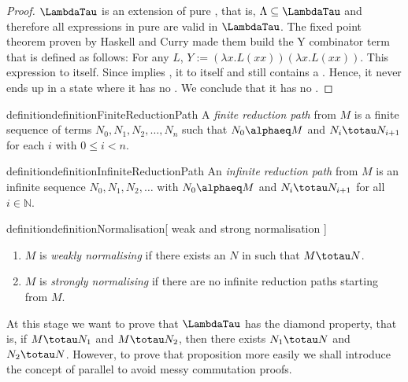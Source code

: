 \begin{proof}
     $\LambdaTau$ is an extension of pure \lambdacalc, that is, $\Lambda \subseteq \LambdaTau$ and therefore all expressions in pure \lambdacalc are valid in $\LambdaTau$. The fixed point theorem proven by Haskell and Curry made them build the Y combinator term that is defined as follows: For any $L$, $Y:=(\lambda x.L(xx))(\lambda x.L(xx))$. This expression \betareduces to itself. Since \betareduction implies \taureduction, it \taureduces to itself and still contains a \tauredex. Hence, it never ends up in a state where it has no \tauredex. We conclude that it has no \taunormalform.
\end{proof}

\begin{reusable}{definition}{definitionFiniteReductionPath}
    A \emph{finite reduction path} from \(M\) is a finite sequence of terms $N_0, N_1, N_2, \ldots, N_n$ such that \(N_0 \alphaeq M\) and \(N_i \totau N_{i+1}\) for each \(i\) with \(0 \le i < n\).
\end{reusable}

\begin{reusable}{definition}{definitionInfiniteReductionPath}
    An \emph{infinite reduction path} from \(M\) is an infinite sequence $N_0, N_1, N_2, \ldots$ with \(N_0 \alphaeq M\) and \(N_i \totau N_{i+1}\) for all \(i \in \mathbb{N}\).
\end{reusable}

\begin{reusable}{definition}{definitionNormalisation}[ weak and strong normalisation ]
    \begin{enumerate}
        \item \( M \) is \textit{weakly normalising} if there exists an \( N \) in \taunormalform such that \( M \totau N \).
        \item \( M \) is \textit{strongly normalising} if there are no infinite reduction paths starting from \( M \).
    \end{enumerate}
\end{reusable}

At this stage we want to prove that $\LambdaTau$ has the diamond property, that is, if $M \totau N_{1}$ and $M \totau N_{2}$, then there exists $N_{1} \totau N$ and $N_{2} \totau N$. However, to prove that proposition more easily we shall introduce the concept of parallel \taureduction to avoid messy commutation proofs.

